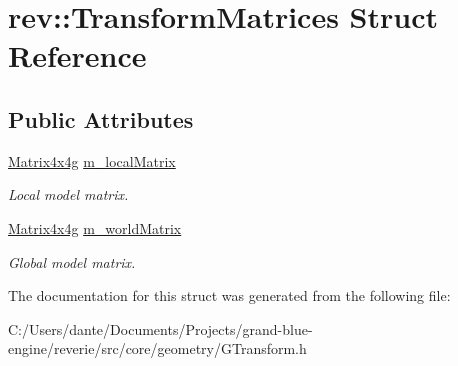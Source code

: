 \hypertarget{structrev_1_1_transform_matrices}{}\section{rev\+::Transform\+Matrices Struct Reference}
\label{structrev_1_1_transform_matrices}
\subsection*{Public Attributes}
\begin{DoxyCompactItemize}
\item 
\mbox{\label{structrev_1_1_transform_matrices_ae8d3593f984ec37fc25ce04c6b4a1aa6}} 
\mbox{\hyperlink{classrev_1_1_square_matrix}{Matrix4x4g}} \mbox{\hyperlink{structrev_1_1_transform_matrices_ae8d3593f984ec37fc25ce04c6b4a1aa6}{m\+\_\+local\+Matrix}}
\begin{DoxyCompactList}\small\item\em Local model matrix. \end{DoxyCompactList}\item 
\mbox{\label{structrev_1_1_transform_matrices_a85b40bfcdb1e194defaf34333e02546b}} 
\mbox{\hyperlink{classrev_1_1_square_matrix}{Matrix4x4g}} \mbox{\hyperlink{structrev_1_1_transform_matrices_a85b40bfcdb1e194defaf34333e02546b}{m\+\_\+world\+Matrix}}
\begin{DoxyCompactList}\small\item\em Global model matrix. \end{DoxyCompactList}\end{DoxyCompactItemize}


The documentation for this struct was generated from the following file\+:\begin{DoxyCompactItemize}
\item 
C\+:/\+Users/dante/\+Documents/\+Projects/grand-\/blue-\/engine/reverie/src/core/geometry/G\+Transform.\+h\end{DoxyCompactItemize}

